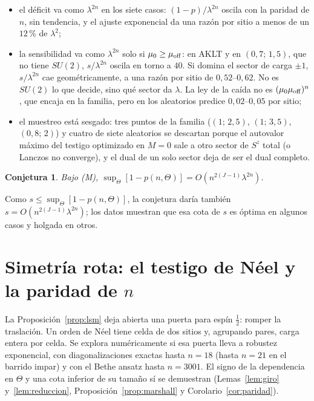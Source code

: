 \documentclass[11pt,a4paper]{article}
\newtheorem{conjetura}[teorema]{Conjetura}
\theoremstyle{remark}
\begin{document}
\begin{itemize}
\item el déficit va como $\lambda^{2n}$ en los siete casos: $(1-p)/\lambda^{2n}$ oscila con la
  paridad de $n$, sin tendencia, y el ajuste exponencial da una razón por sitio a menos de un
  $12$\,\% de $\lambda^2$;
\item la sensibilidad va como $\lambda^{2n}$ solo si $\mu_0\ge\mu_{\rm off}$: en AKLT y en
  $(0{,}7;\,1{,}5)$, que no tiene $SU(2)$, $s/\lambda^{2n}$ oscila en torno a $40$. Si domina el
  sector de carga $\pm1$, $s/\lambda^{2n}$ cae geométricamente, a una razón por sitio de
  $0{,}52$--$0{,}62$. No es $SU(2)$ lo que decide, sino qué sector da $\lambda$. La ley de la caída
  no es $(\mu_0\mu_{\rm off})^n$, que encaja en la familia, pero en los aleatorios predice
  $0{,}02$--$0{,}05$ por sitio;
\item el muestreo está sesgado: tres puntos de la familia ($(1;\,2{,}5)$, $(1;\,3{,}5)$,
  $(0{,}8;\,2)$) y cuatro de siete aleatorios se descartan porque el autovalor máximo del testigo
  optimizado en $M=0$ sale a otro sector de $S^z$ total (o Lanczos no converge), y el dual de un
  solo sector deja de ser el dual completo.
\end{itemize}

\begin{conjetura}\label{conj:deficit}
Bajo (M), $\sup_\Theta[1-p(n,\Theta)]=O(n^{2(J-1)}\lambda^{2n})$.
\end{conjetura}

Como $s\le\sup_\Theta[1-p(n,\Theta)]$, la conjetura daría también $s=O(n^{2(J-1)}\lambda^{2n})$; los datos
muestran que esa cota de $s$ es óptima en algunos casos y holgada en otros.

\section{Simetría rota: el testigo de Néel y la paridad de $n$}\label{sec:neel}

La Proposición~\ref{prop:lsm} deja abierta una puerta para espín $\tfrac12$: romper la
traslación. Un orden de Néel tiene celda de dos sitios y, agrupando pares, carga entera por celda.
Se explora numéricamente si esa puerta lleva a robustez exponencial, con diagonalizaciones exactas
hasta $n=18$ (hasta $n=21$ en el barrido impar) y con el Bethe ansatz hasta $n=3001$. El signo de
la dependencia en $\Theta$ y una cota inferior de su tamaño sí se demuestran (Lemas~\ref{lem:giro}
y~\ref{lem:reduccion}, Proposición~\ref{prop:marshall} y Corolario~\ref{cor:paridad}).
\end{document}
